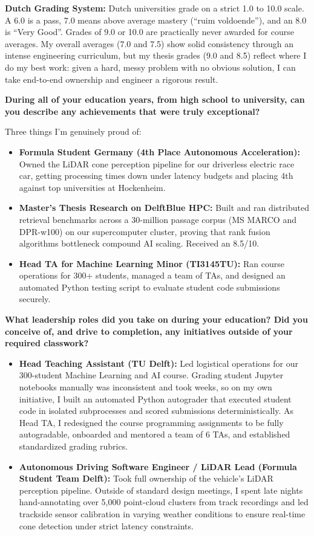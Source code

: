 \documentclass[letterpaper,11pt]{article}
\newcommand{\interviewQuestion}[1]{%
  \vspace{8pt}%
  \textbf{\color{airforceblue}#1}\par%
}
\begin{document}
\textbf{Dutch Grading System:} Dutch universities grade on a strict 1.0 to 10.0 scale. A 6.0 is a pass, 7.0 means above average mastery (``ruim voldoende''), and an 8.0 is ``Very Good''. Grades of 9.0 or 10.0 are practically never awarded for course averages. My overall averages (7.0 and 7.5) show solid consistency through an intense engineering curriculum, but my thesis grades (9.0 and 8.5) reflect where I do my best work: given a hard, messy problem with no obvious solution, I can take end-to-end ownership and engineer a rigorous result.

\interviewQuestion{During all of your education years, from high school to university, can you describe any achievements that were truly exceptional?}

Three things I'm genuinely proud of:
\begin{itemize}[leftmargin=0.2in, itemsep=3pt]
    \item \textbf{Formula Student Germany (4th Place Autonomous Acceleration):} Owned the LiDAR cone perception pipeline for our driverless electric race car, getting processing times down under latency budgets and placing 4th against top universities at Hockenheim.
    \item \textbf{Master's Thesis Research on DelftBlue HPC:} Built and ran distributed retrieval benchmarks across a 30-million passage corpus (MS MARCO and DPR-w100) on our supercomputer cluster, proving that rank fusion algorithms bottleneck compound AI scaling. Received an 8.5/10.
    \item \textbf{Head TA for Machine Learning Minor (TI3145TU):} Ran course operations for 300+ students, managed a team of TAs, and designed an automated Python testing script to evaluate student code submissions securely.
\end{itemize}

\interviewQuestion{What leadership roles did you take on during your education? Did you conceive of, and drive to completion, any initiatives outside of your required classwork?}

\begin{itemize}[leftmargin=0.2in, itemsep=3pt]
    \item \textbf{Head Teaching Assistant (TU Delft):} Led logistical operations for our 300-student Machine Learning and AI course. Grading student Jupyter notebooks manually was inconsistent and took weeks, so on my own initiative, I built an automated Python autograder that executed student code in isolated subprocesses and scored submissions deterministically. As Head TA, I redesigned the course programming assignments to be fully autogradable, onboarded and mentored a team of 6 TAs, and established standardized grading rubrics.
    \item \textbf{Autonomous Driving Software Engineer / LiDAR Lead (Formula Student Team Delft):} Took full ownership of the vehicle's LiDAR perception pipeline. Outside of standard design meetings, I spent late nights hand-annotating over 5,000 point-cloud clusters from track recordings and led trackside sensor calibration in varying weather conditions to ensure real-time cone detection under strict latency constraints.
\end{itemize}
\end{document}
